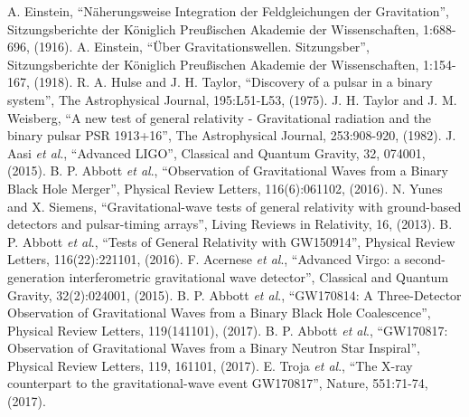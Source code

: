  A. Einstein, ``N\"{a}herungsweise Integration der Feldgleichungen der Gravitation'', Sitzungsberichte der K\"{o}niglich Preu\ss ischen Akademie der Wissenschaften, 1:688-696, (1916).
\vspace{2mm}
 A. Einstein, ``\"{U}ber Gravitationswellen. Sitzungsber'', Sitzungsberichte der K\"{o}niglich Preu\ss ischen Akademie der Wissenschaften, 1:154-167, (1918).
\vspace{2mm}
 R. A. Hulse and J. H. Taylor, ``Discovery of a pulsar in a binary system'', The Astrophysical Journal, 195:L51-L53, (1975).
\vspace{2mm}
 J. H. Taylor and J. M. Weisberg, ``A new test of general relativity - Gravitational radiation and the binary pulsar PSR 1913+16'', The Astrophysical Journal, 253:908-920, (1982).
\vspace{2mm}
 J. Aasi \textit{et al}., ``Advanced LIGO'', Classical and Quantum Gravity, 32, 074001, (2015).
\vspace{2mm}
 B. P. Abbott \textit{et al}., ``Observation of Gravitational Waves from a Binary Black Hole Merger'', Physical Review Letters, 116(6):061102, (2016).
\vspace{2mm}
 N. Yunes and X. Siemens, ``Gravitational-wave tests of general relativity with ground-based detectors and pulsar-timing arrays'', Living Reviews in Relativity, 16, (2013).
\vspace{2mm}
 B. P. Abbott \textit{et al}., ``Tests of General Relativity with GW150914'', Physical Review Letters, 116(22):221101, (2016).
\vspace{2mm}
  F. Acernese \textit{et al}., ``Advanced Virgo: a second-generation interferometric gravitational wave detector'', Classical and Quantum Gravity, 32(2):024001, (2015).
\vspace{2mm}
 B. P. Abbott \textit{et al}., ``GW170814: A Three-Detector Observation of Gravitational Waves from a Binary Black Hole Coalescence'', Physical Review Letters, 119(141101), (2017).
\vspace{2mm}
 B. P. Abbott \textit{et al}., ``GW170817: Observation of Gravitational Waves from a Binary Neutron Star Inspiral'', Physical Review Letters, 119, 161101, (2017).
\vspace{2mm}
 E. Troja \textit{et al}., ``The X-ray counterpart to the gravitational-wave event GW170817'', Nature, 551:71-74, (2017).
\vspace{2mm}
